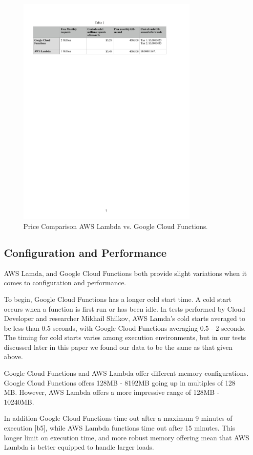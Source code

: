 \documentclass[10pt, conference]{IEEEtran}
\begin{document}
\begin{figure}[htbp]
\centerline{\includegraphics[width=9cm]{table1.PDF}}
\caption{Price Comparison AWS Lambda vs. Google Cloud Functions.}
\label{fig}
\end{figure}

\subsection{Configuration and Performance}

AWS Lamda, and Google Cloud Functions both provide slight variations when it comes to configuration and performance. 

To begin, Google Cloud Functions has a longer cold start time. A cold start occurs when a function is first run or has been idle. In tests performed by Cloud Developer and researcher Mikhail Shilkov, AWS Lamda's cold starts averaged to be less than 0.5 seconds, with Google Cloud Functions averaging 0.5 - 2 seconds. The timing for cold starts varies among execution environments, but in our tests discussed later in this paper we found our data to be the same as that given above. 

Google Cloud Functions and AWS Lambda offer different memory configurations. Google Cloud Functions offers 128MB - 8192MB going up in multiples of 128 MB. However, AWS Lambda offers a more impressive range of 128MB - 10240MB. 

In addition Google Cloud Functions time out after a maximum 9 minutes of execution [b5], while AWS Lambda functions time out after 15 minutes. This longer limit on execution time, and more robust memory offering mean that AWS Lambda is better equipped to handle larger loads. 
\end{document}
